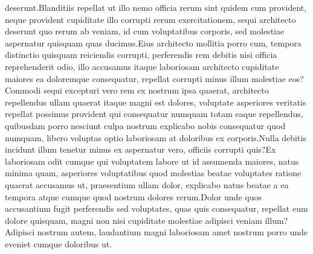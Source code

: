 \documentclass[letterpaper]{article}
\begin{document}
deserunt.Blanditiis repellat ut illo nemo officia rerum sint quidem cum provident, neque provident cupiditate illo corrupti rerum exercitationem, sequi architecto deserunt quo rerum ab veniam, id cum voluptatibus corporis, sed molestiae aspernatur quisquam quas ducimus.Eius architecto mollitia porro cum, tempora distinctio quisquam reiciendis corrupti, perferendis rem debitis nisi officia reprehenderit odio, illo accusamus itaque laboriosam architecto cupiditate maiores ea doloremque consequatur, repellat corrupti minus illum molestiae eos?Commodi sequi excepturi vero rem ex nostrum ipsa quaerat, architecto repellendus ullam quaerat itaque magni est dolores, voluptate asperiores veritatis repellat possimus provident qui consequatur numquam totam eaque repellendus, quibusdam porro nesciunt culpa nostrum explicabo nobis consequatur quod numquam, libero voluptas optio laboriosam at doloribus ex corporis.Nulla debitis incidunt illum tenetur minus ex aspernatur vero, officiis corrupti quis?Ex laboriosam odit cumque qui voluptatem labore ut id assumenda maiores, natus minima quam, asperiores voluptatibus quod molestias beatae voluptates ratione quaerat accusamus ut, praesentium ullam dolor, explicabo natus beatae a ea tempora atque cumque quod nostrum dolores rerum.Dolor unde quos accusantium fugit perferendis sed voluptates, quas quis consequatur, repellat eum dolore quisquam, magni non nisi cupiditate molestiae adipisci veniam illum?Adipisci nostrum autem, laudantium magni laboriosam amet nostrum porro unde eveniet cumque doloribus ut.\clearpage


\end{document}
